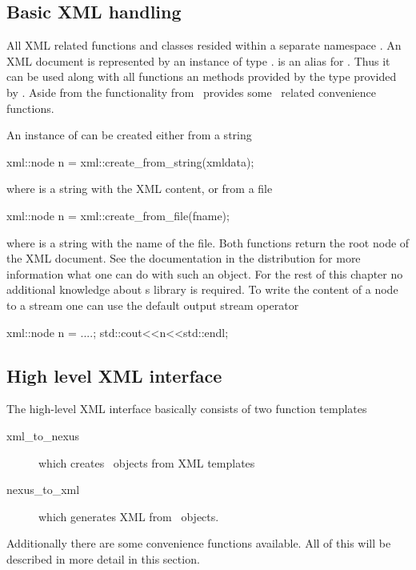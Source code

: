 \subsection{Basic XML handling}{\label{sec:xml:basic}

All XML related functions and classes resided within a separate namespace 
. An XML document is represented by an instance of 
type .  is an alias for . 
Thus it can be used along with all functions an methods provided by the 
 type provided by . Aside from the 
functionality from  \libpniio\ provides some 
\nexus\ related convenience functions. 

An instance of  can be created either from a string
\begin{cppcode}
    xml::node n = xml::create_from_string(xmldata);
\end{cppcode}
where  is a string with the XML content, 
or from a file
\begin{cppcode}
    xml::node n = xml::create_from_file(fname);
\end{cppcode}
where  is a string with the name of the file. Both functions 
return the root node of the XML document. See the 
documentation in the  distribution for more information what one can
do with such an object. For the rest of this chapter no additional knowledge
about s  library is required.
To write the content of a node to a stream one can use the default 
output stream operator
\begin{cppcode}
    xml::node n = ....;
    std::cout<<n<<std::endl;
\end{cppcode}


\subsection{High level XML interface}\label{sec:xml:highlevel}

The high-level XML interface basically consists of two function templates 
\begin{description}
\item[xml\_to\_nexus] which creates \nexus\ objects from XML templates
\item[nexus\_to\_xml] which generates XML from \nexus\ objects.
\end{description}
Additionally there are some convenience functions available. All of this will be
described in more detail in this section.

}
